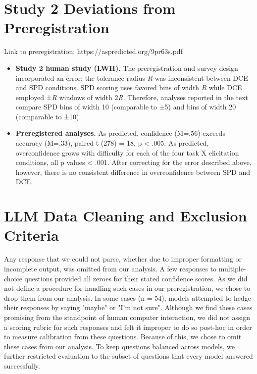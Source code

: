 \documentclass{article}
\begin{document}
\begin{appendices}
\section{Study 2 Deviations from Preregistration}
\label{Appendix: deviations2}
Link to preregistration: https://aspredicted.org/9pr63s.pdf

\begin{itemize}
  \item \textbf{Study 2 human study (LWH).} The preregistration and survey design incorporated an error: the tolerance radius \textit{R} was inconsistent between DCE and SPD conditions. SPD scoring uses favored bins of width \textit{R} while DCE employed ±\textit{R} windows of width 2\textit{R}. Therefore, analyses reported in the text compare SPD bins of width 10 (comparable to ±5) and bins of width 20 (comparable to ±10). 
  
  \item \textbf{Preregistered analyses.} As predicted, confidence (M=.56) exceeds accuracy (M=.33), paired t (278) = 18, p < .005. As predicted, overconfidence grows with difficulty for each of the four task X elicitation conditions, all p values < .001.  After correcting for the error described above, however, there is no consistent difference in overconfidence between SPD and DCE.
\end{itemize}

\section{LLM Data Cleaning and Exclusion Criteria}
\label{Appendix: DataCleaning}
Any response that we could not parse, whether due to improper formatting or incomplete output, was omitted from our analysis. A few responses to multiple-choice questions provided all zeroes for their stated confidence scores. As we did not define a procedure for handling such cases in our preregistration, we chose to drop them from our analysis. In some cases (n = 54), models attempted to hedge their responses by saying "maybe" or "I'm not sure". Although we find these cases promising from the standpoint of human computer interaction, we did not assign a scoring rubric for such responses and felt it improper to do so post-hoc in order to measure calibration from these questions. Because of this, we chose to omit these cases from our analysis. To keep questions balanced across models, we further restricted evaluation to the subset of questions that every model answered successfully.


\end{appendices}
\end{document}
